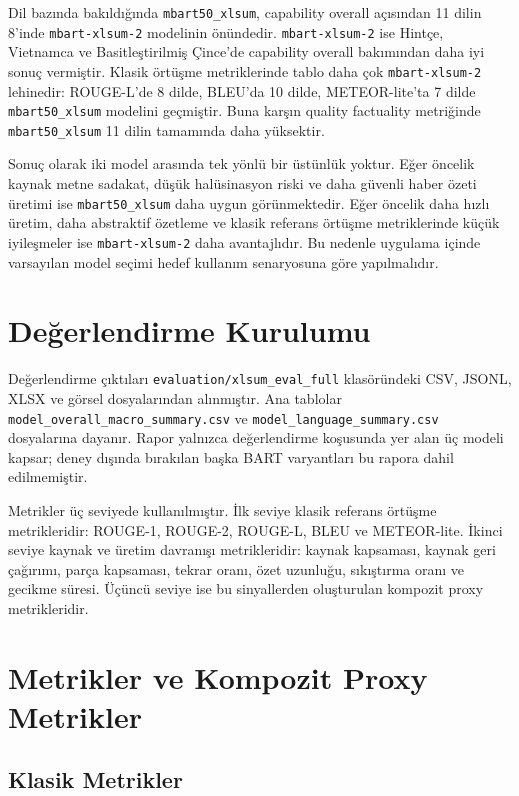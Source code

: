 \documentclass[12pt,a4paper]{article}
\begin{document}
Dil bazında bakıldığında \texttt{mbart50\_xlsum}, capability overall açısından 11 dilin 8'inde \texttt{mbart-xlsum-2} modelinin önündedir. \texttt{mbart-xlsum-2} ise Hintçe, Vietnamca ve Basitleştirilmiş Çince'de capability overall bakımından daha iyi sonuç vermiştir. Klasik örtüşme metriklerinde tablo daha çok \texttt{mbart-xlsum-2} lehinedir: ROUGE-L'de 8 dilde, BLEU'da 10 dilde, METEOR-lite'ta 7 dilde \texttt{mbart50\_xlsum} modelini geçmiştir. Buna karşın quality factuality metriğinde \texttt{mbart50\_xlsum} 11 dilin tamamında daha yüksektir.

Sonuç olarak iki model arasında tek yönlü bir üstünlük yoktur. Eğer öncelik kaynak metne sadakat, düşük halüsinasyon riski ve daha güvenli haber özeti üretimi ise \texttt{mbart50\_xlsum} daha uygun görünmektedir. Eğer öncelik daha hızlı üretim, daha abstraktif özetleme ve klasik referans örtüşme metriklerinde küçük iyileşmeler ise \texttt{mbart-xlsum-2} daha avantajlıdır. Bu nedenle uygulama içinde varsayılan model seçimi hedef kullanım senaryosuna göre yapılmalıdır.

\section{Değerlendirme Kurulumu}

Değerlendirme çıktıları \texttt{evaluation/xlsum\_eval\_full} klasöründeki CSV, JSONL, XLSX ve görsel dosyalarından alınmıştır. Ana tablolar \texttt{model\_overall\_macro\_summary.csv} ve \texttt{model\_language\_summary.csv} dosyalarına dayanır. Rapor yalnızca değerlendirme koşusunda yer alan üç modeli kapsar; deney dışında bırakılan başka BART varyantları bu rapora dahil edilmemiştir.

Metrikler üç seviyede kullanılmıştır. İlk seviye klasik referans örtüşme metrikleridir: ROUGE-1, ROUGE-2, ROUGE-L, BLEU ve METEOR-lite. İkinci seviye kaynak ve üretim davranışı metrikleridir: kaynak kapsaması, kaynak geri çağırımı, parça kapsaması, tekrar oranı, özet uzunluğu, sıkıştırma oranı ve gecikme süresi. Üçüncü seviye ise bu sinyallerden oluşturulan kompozit proxy metrikleridir.

\section{Metrikler ve Kompozit Proxy Metrikler}

\subsection{Klasik Metrikler}
\end{document}
